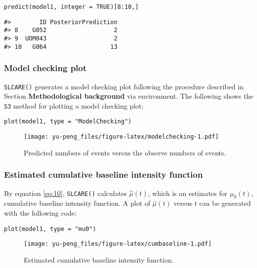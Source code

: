 \begin{verbatim}
predict(model1, integer = TRUE)[8:10,]
\end{verbatim}

\begin{verbatim}
#>        ID PosteriorPrediction
#> 8    G052                   2
#> 9  UOM043                   2
#> 10   G064                  13
\end{verbatim}

\hypertarget{model-checking-plot}{%
\subsubsection{Model checking plot}\label{model-checking-plot}}

\texttt{SLCARE()} generates a model checking plot following the procedure described in Section \textbf{Methodological background} via  environment. The following shows the \texttt{S3} method for plotting a model checking plot:

\begin{verbatim}
plot(model1, type = "ModelChecking")
\end{verbatim}

\begin{figure}
\centering
\texttt{[image: yu-peng\_files/figure-latex/modelchecking-1.pdf]}
\caption{\label{fig:modelchecking}Predicted numbers of events versus the observe numbers of events.}
\end{figure}

\hypertarget{estimated-cumulative-baseline-intensity-function}{%
\subsubsection{Estimated cumulative baseline intensity function}\label{estimated-cumulative-baseline-intensity-function}}

By equation \eqref{eq:10}, \texttt{SLCARE()} calculates \(\hat{\mu}(t)\), which is an estimates for \(\mu _{0} (t)\), cumulative baseline intensity function. A plot of \(\hat{\mu}(t)\) versus \(t\) can be generated with the following code:

\begin{verbatim}
plot(model1, type = "mu0")
\end{verbatim}

\begin{figure}
\centering
\texttt{[image: yu-peng\_files/figure-latex/cumbaseline-1.pdf]}
\caption{\label{fig:cumbaseline}Estimated cumulative baseline intensity function.}
\end{figure}

